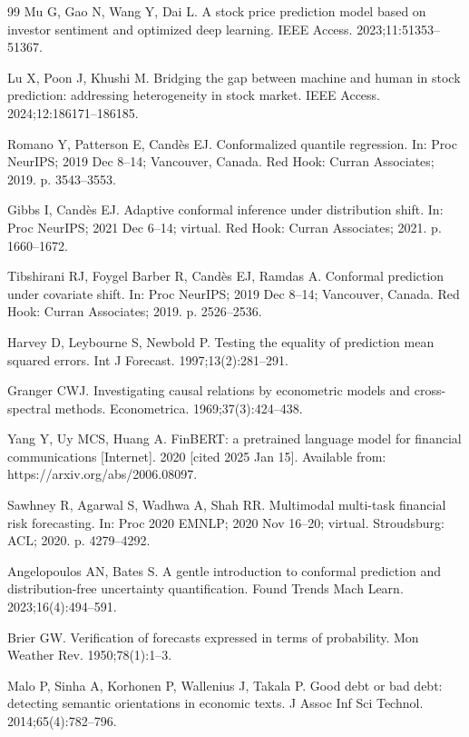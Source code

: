 \documentclass[12pt,a4paper]{article}
\begin{document}
\begin{singlespace}
\begin{thebibliography}{99}
Mu G, Gao N, Wang Y, Dai L. A stock price prediction model based on
investor sentiment and optimized deep learning. IEEE Access.
2023;11:51353--51367.

Lu X, Poon J, Khushi M. Bridging the gap between machine and human in
stock prediction: addressing heterogeneity in stock market. IEEE Access.
2024;12:186171--186185.

Romano Y, Patterson E, Cand\`{e}s EJ. Conformalized quantile regression.
In: Proc NeurIPS; 2019 Dec 8--14; Vancouver, Canada. Red Hook: Curran
Associates; 2019. p. 3543--3553.

Gibbs I, Cand\`{e}s EJ. Adaptive conformal inference under distribution
shift. In: Proc NeurIPS; 2021 Dec 6--14; virtual. Red Hook: Curran
Associates; 2021. p. 1660--1672.

Tibshirani RJ, Foygel Barber R, Cand\`{e}s EJ, Ramdas A. Conformal
prediction under covariate shift. In: Proc NeurIPS; 2019 Dec 8--14;
Vancouver, Canada. Red Hook: Curran Associates; 2019. p. 2526--2536.

Harvey D, Leybourne S, Newbold P. Testing the equality of prediction mean
squared errors. Int J Forecast. 1997;13(2):281--291.

Granger CWJ. Investigating causal relations by econometric models and
cross-spectral methods. Econometrica. 1969;37(3):424--438.

Yang Y, Uy MCS, Huang A. FinBERT: a pretrained language model for financial
communications [Internet]. 2020 [cited 2025 Jan 15]. Available from:
https://arxiv.org/abs/2006.08097.

Sawhney R, Agarwal S, Wadhwa A, Shah RR. Multimodal multi-task financial
risk forecasting. In: Proc 2020 EMNLP; 2020 Nov 16--20; virtual.
Stroudsburg: ACL; 2020. p. 4279--4292.

Angelopoulos AN, Bates S. A gentle introduction to conformal prediction and
distribution-free uncertainty quantification. Found Trends Mach Learn.
2023;16(4):494--591.

Brier GW. Verification of forecasts expressed in terms of probability. Mon
Weather Rev. 1950;78(1):1--3.

Malo P, Sinha A, Korhonen P, Wallenius J, Takala P. Good debt or bad debt:
detecting semantic orientations in economic texts. J Assoc Inf Sci Technol.
2014;65(4):782--796.

\end{thebibliography}
\end{singlespace}
\end{document}
